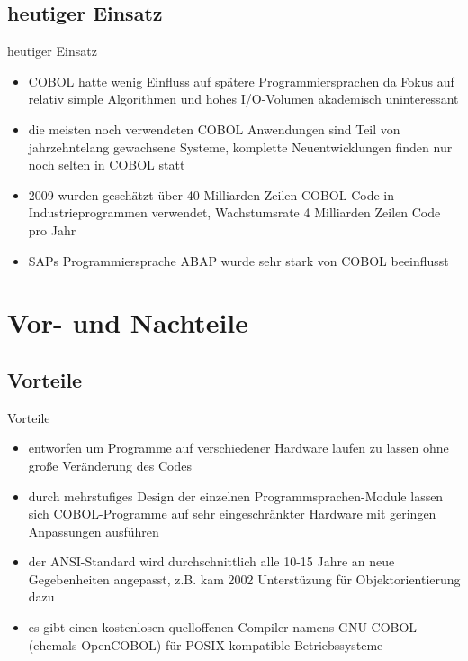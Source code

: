 \documentclass[handout]{beamer}
\begin{document}
\subsection{heutiger Einsatz}

\begin{frame}{heutiger Einsatz}
	\begin{itemize}
		\item
			COBOL hatte wenig Einfluss auf sp\"atere Programmiersprachen da Fokus auf relativ simple Algorithmen und hohes I/O-Volumen akademisch uninteressant
		\item
			die meisten noch verwendeten COBOL Anwendungen sind Teil von jahrzehntelang gewachsene Systeme, komplette Neuentwicklungen finden nur noch selten in COBOL statt
		\item
			2009 wurden geschätzt \"uber 40 Milliarden Zeilen COBOL Code in Industrieprogrammen verwendet, Wachstumsrate 4 Milliarden Zeilen Code pro Jahr
		\item
			SAPs Programmiersprache ABAP wurde sehr stark von COBOL beeinflusst
	\end{itemize}
\end{frame}

\section{Vor- und Nachteile}

\subsection{Vorteile}

\begin{frame}{Vorteile}
	\begin{itemize}
		\item
			entworfen um Programme auf verschiedener Hardware laufen zu lassen ohne große Ver\"anderung des Codes
		\item
			durch mehrstufiges Design der einzelnen Programmsprachen-Module lassen sich COBOL-Programme auf sehr eingeschr\"ankter Hardware mit geringen Anpassungen ausf\"uhren
		\item
			der ANSI-Standard wird durchschnittlich alle 10-15 Jahre an neue Gegebenheiten angepasst, z.B. kam 2002 Unterstüzung für Objektorientierung dazu
		\item
			es gibt einen kostenlosen quelloffenen Compiler namens GNU COBOL (ehemals OpenCOBOL) für POSIX-kompatible Betriebssysteme
	\end{itemize}
\end{frame}
\end{document}
